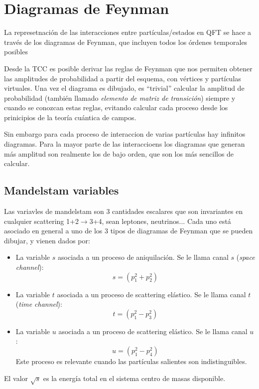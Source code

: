 \section{Diagramas de Feynman}

La represetnación de las interacciones entre partículas/estados en QFT se hace a través de los diagramas de Feynman, que incluyen todos los órdenes temporales posibles  

Desde la TCC es posible derivar las reglas de Feynman que nos permiten obtener las amplitudes de probabilidad a partir del esquema, con vértices y partículas virtuales. Una vez el diagrama es dibujado, es ``trivial'' calcular la amplitud  de probabilidad (también llamado \textit{elemento de matriz de transición}) siempre y cuando se conozcan estas reglas, evitando calcular cada proceso desde los prinicipios de la teoría cuántica de campos. 

Sin embargo para cada proceso de interaccion de varias partículas hay infinitos diagramas. Para la mayor parte de las interaccioens los diagramas que generan más amplitud son realmente los de bajo orden, que son los más sencillos de calcular. 



\subsection{Mandelstam variables}

Las variavles de mandelstam son 3 cantidades escalares que son invariantes en cualquier scattering 1+2$\to$3+4, sean leptones, neutrinos... Cada uno está asociado en general a uno de los 3 tipos de diagramas de Feynman que se pueden dibujar, y vienen dados por: 

\begin{itemize}
	\item La variable $s$ asociada a un proceso de aniquilación. Se le llama canal $s$ (\textit{space channel}): 
	\begin{equation}
		s = (p_1^2 + p_2^2)
	\end{equation}
	\item La variable $t$ asociada a un proceso de  scattering elástico. Se le llama canal $t$ (\textit{time channel}): 
	\begin{equation}
		t = (p_1^2 - p_3^2)
	\end{equation}
	\item La variable $u$ asociada a un proceso de scattering elástico. Se le llama canal $u$:
	\begin{equation}
		u = (p_1^2 - p_4^2)
	\end{equation}
	Este proceso es relevante cuando las partículas salientes son indistinguibles. 
\end{itemize}
El valor $\sqrt{s}$ es la energía total en el sistema centro de masas disponible. 


